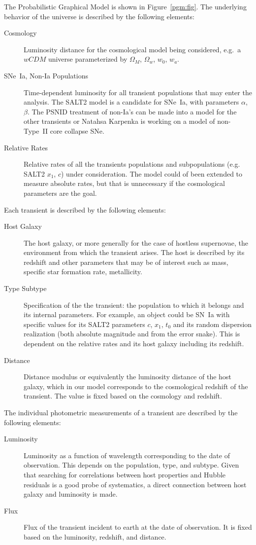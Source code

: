 \documentclass[preprint,3p]{elsarticle}
\begin{document}
The Probabilistic Graphical Model is shown in Figure~\ref{pgm:fig}. The underlying behavior of the universe is described by the following elements:
\begin{description}
\item [Cosmology] Luminosity distance for the cosmological model being considered,
e.g.\ a $wCDM$ universe parameterized by $\Omega_M$, $\Omega_w$, $w_0$, $w_a$.
\item[SNe~Ia, Non-Ia Populations] Time-dependent luminosity for all transient populations
that may enter
the analysis.  The SALT2 model is a candidate for SNe~Ia, with parameters $\alpha$, $\beta$.  The PSNID treatment of non-Ia's can be made into a model for the other
transients or Natahsa Karpenka is working on a model of non-Type~II core collapse SNe.
\item [Relative Rates] Relative rates of all the transients populations and
subpopulations (e.g. SALT2 $x_1$, $c$) under consideration.  The
model could of been extended to measure absolute rates, but that is unnecessary if
the cosmological parameters are the goal.
\end{description}
Each transient is described by the following elements:
\begin{description}
\item[Host Galaxy] The host galaxy, or more generally for the case of hostless supernovae,
the environment from which the transient arises.  The host is described by its redshift
and other parameters that may be of interest such as mass,
specific star formation rate, metallicity.
\item[Type Subtype] Specification of the the transient: the population to which it belongs
and its internal parameters.  For example, an object could be SN~Ia with specific
values for its SALT2 parameters $c$, $x_1$, $t_0$ and its random dispersion
realization (both absolute magnitude and from the error snake). 
This is dependent on the relative rates and
its host galaxy including its redshift.
\item[Distance] Distance modulus or equivalently the luminosity distance of the host galaxy,
which in our model corresponds to the cosmological redshift of the transient.  The value
is fixed based on the cosmology and redshift.
\end{description}
The individual photometric measurements of a transient are described by the following
elements:
\begin{description}
\item[Luminosity]  Luminosity as a function of wavelength
corresponding to the date of observation.   This depends on the population, type,
and subtype.  Given that searching for correlations between  host properties and Hubble
residuals is a good probe of systematics,
a direct connection between host galaxy and luminosity is made.
\item[Flux] Flux of the transient incident to earth at the date of observation.  It is 
fixed based on the luminosity, redshift, and distance.
\end{description}
\end{document}
